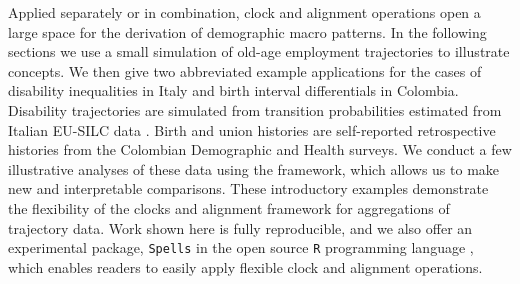 \documentclass[a4paper,left=1.25cm,right=1.25cm,top=1.25cm,bottom=1.25cm]{article}
\begin{document}
Applied separately or in combination, clock and alignment operations open a large space for the derivation of demographic macro patterns. In the following sections we use a small simulation of old-age employment trajectories to illustrate concepts. We then give two abbreviated example applications for the cases of disability inequalities in Italy and birth interval differentials in Colombia. Disability trajectories are simulated from transition probabilities estimated from Italian EU-SILC data \citep{SILC}. Birth and union histories are self-reported retrospective histories from the Colombian Demographic and Health surveys. We conduct a few illustrative analyses of these data using the framework, which allows us to make new and interpretable comparisons. These introductory examples demonstrate the flexibility of the clocks and alignment framework for aggregations of trajectory data. Work shown here is fully reproducible, and we also offer an experimental package, \texttt{Spells} in the open source \texttt{R} programming language \citep{r2020}, which enables readers to easily apply flexible clock and alignment operations.
% 
\end{document}
